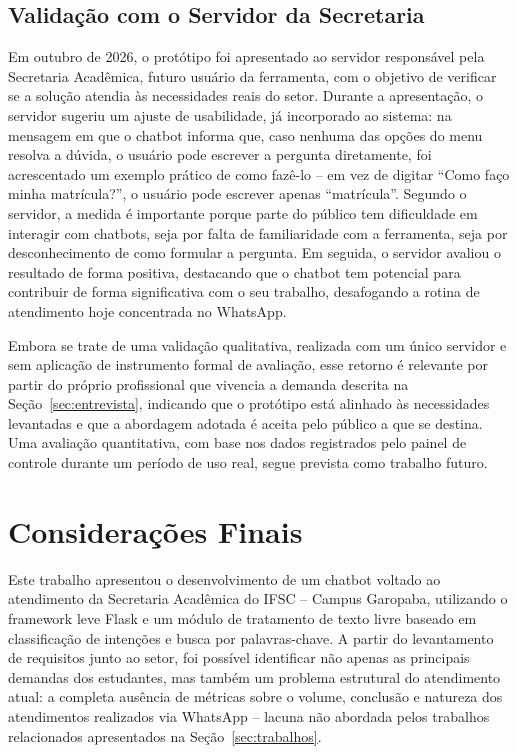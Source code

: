 \documentclass[12pt]{article}
\begin{document}
\subsection{Validação com o Servidor da Secretaria}

Em outubro de 2026, o protótipo foi apresentado ao servidor responsável
pela Secretaria Acadêmica, futuro usuário da ferramenta, com o objetivo
de verificar se a solução atendia às necessidades reais do setor. Durante
a apresentação, o servidor sugeriu um ajuste de usabilidade, já
incorporado ao sistema: na mensagem em que o chatbot informa que, caso
nenhuma das opções do menu resolva a dúvida, o usuário pode escrever a
pergunta diretamente, foi acrescentado um exemplo prático de como fazê-lo
-- em vez de digitar ``Como faço minha matrícula?'', o usuário pode
escrever apenas ``matrícula''. Segundo o servidor, a medida é importante
porque parte do público tem dificuldade em interagir com chatbots, seja
por falta de familiaridade com a ferramenta, seja por desconhecimento de
como formular a pergunta. Em seguida, o servidor avaliou o resultado de
forma positiva, destacando que o chatbot tem potencial para contribuir de
forma significativa com o seu trabalho, desafogando a rotina de
atendimento hoje concentrada no WhatsApp.

Embora se trate de uma validação qualitativa, realizada com um único
servidor e sem aplicação de instrumento formal de avaliação, esse retorno
é relevante por partir do próprio profissional que vivencia a demanda
descrita na Seção~\ref{sec:entrevista}, indicando que o protótipo está alinhado às
necessidades levantadas e que a abordagem adotada é aceita pelo público
a que se destina. Uma avaliação quantitativa, com base nos dados
registrados pelo painel de controle durante um período de uso real, segue
prevista como trabalho futuro.

\section{Considerações Finais}

Este trabalho apresentou o desenvolvimento de um chatbot voltado ao
atendimento da Secretaria Acadêmica do IFSC -- Campus Garopaba,
utilizando o framework leve Flask e um módulo de tratamento de texto livre baseado em classificação de intenções e busca por palavras-chave. A partir do levantamento de
requisitos junto ao setor, foi possível identificar não apenas as
principais demandas dos estudantes, mas também um problema estrutural do
atendimento atual: a completa ausência de métricas sobre o volume,
conclusão e natureza dos atendimentos realizados via WhatsApp -- lacuna
não abordada pelos trabalhos relacionados apresentados na Seção~\ref{sec:trabalhos}.
\end{document}
